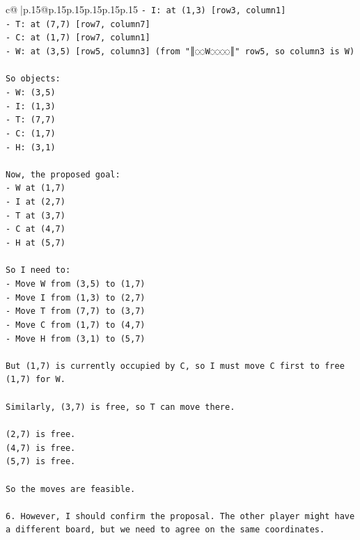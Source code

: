 \documentclass{article}
\begin{document}
{\begin{supertabular}{c@{$\;$}|p{.15\linewidth}@{}p{.15\linewidth}p{.15\linewidth}p{.15\linewidth}p{.15\linewidth}p{.15\linewidth}}
{{{\texttt{{-} I: at (1,3) {[}row3, column1{]}} \\
\texttt{{-} T: at (7,7) {[}row7, column7{]}} \\
\texttt{{-} C: at (1,7) {[}row7, column1{]}} \\
\texttt{{-} W: at (3,5) {[}row5, column3{]} (from "║◌◌W◌◌◌◌║" row5, so column3 is W)} \\
\\ 
\texttt{So objects:} \\
\texttt{{-} W: (3,5)} \\
\texttt{{-} I: (1,3)} \\
\texttt{{-} T: (7,7)} \\
\texttt{{-} C: (1,7)} \\
\texttt{{-} H: (3,1)} \\
\\ 
\texttt{Now, the proposed goal:} \\
\texttt{{-} W at (1,7)} \\
\texttt{{-} I at (2,7)} \\
\texttt{{-} T at (3,7)} \\
\texttt{{-} C at (4,7)} \\
\texttt{{-} H at (5,7)} \\
\\ 
\texttt{So I need to:} \\
\texttt{{-} Move W from (3,5) to (1,7)} \\
\texttt{{-} Move I from (1,3) to (2,7)} \\
\texttt{{-} Move T from (7,7) to (3,7)} \\
\texttt{{-} Move C from (1,7) to (4,7)} \\
\texttt{{-} Move H from (3,1) to (5,7)} \\
\\ 
\texttt{But (1,7) is currently occupied by C, so I must move C first to free (1,7) for W.} \\
\\ 
\texttt{Similarly, (3,7) is free, so T can move there.} \\
\\ 
\texttt{(2,7) is free.} \\
\texttt{(4,7) is free.} \\
\texttt{(5,7) is free.} \\
\\ 
\texttt{So the moves are feasible.} \\
\\ 
\texttt{6. However, I should confirm the proposal. The other player might have a different board, but we need to agree on the same coordinates.} \\
}}}
\end{supertabular}}
\end{document}

